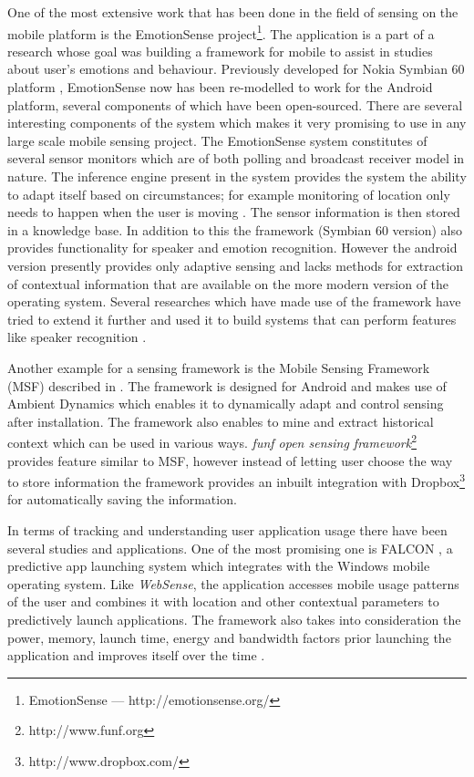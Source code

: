 \documentclass[12pt]{report}
\begin{document}
One of the most extensive work that has been done in the field of sensing on the mobile platform is the EmotionSense project\footnote{EmotionSense — http://emotionsense.org/}. The application is a part of a research whose goal was building a framework for mobile to assist in studies about user's emotions and behaviour. Previously developed for Nokia Symbian 60 platform \cite{rachuri2010emotionsense}, EmotionSense now has been re-modelled to work for the Android platform, several components of which have been open-sourced. There are several interesting components of the system which makes it very promising to use in any large scale mobile sensing project. The EmotionSense system constitutes of several sensor monitors which are of both polling and broadcast receiver model in nature. The inference engine present in the system provides the system the ability to adapt itself based on circumstances; for example monitoring of location only needs to happen when the user is moving \cite{rachuri2010emotionsense}. The sensor information is then stored in a knowledge base. In addition to this the framework (Symbian 60 version) also provides functionality for speaker and emotion recognition. However the android version presently provides only adaptive sensing and lacks methods for extraction of contextual information that are available on the more modern version of the operating system. Several researches which have made use of the framework have tried to extend it further and used it to build systems that can perform features like speaker recognition \cite{lathia2013smartphones}.

Another example for a sensing framework is the Mobile Sensing Framework (MSF) described in \cite{novakextensible2013}. The framework is designed for Android and makes use of Ambient Dynamics \cite{carlson2012dynamix} which enables it to dynamically adapt and control sensing after installation. The framework also enables to mine and extract historical context which can be used in various ways. \textit{funf open sensing framework}\footnote{http://www.funf.org} provides feature similar to MSF, however instead of letting user choose the way to store information the framework provides an inbuilt integration with Dropbox\footnote{http://www.dropbox.com/} for automatically saving the information.

In terms of tracking and understanding user application usage there have been several studies and applications. One of the most promising one is FALCON \cite{yan2012fast}, a predictive app launching system which integrates with the Windows mobile operating system. Like \textit{WebSense}, the application accesses mobile usage patterns of the user and combines it with location and other contextual parameters to predictively launch applications. The framework also takes into consideration the power, memory, launch time, energy and bandwidth factors prior launching the application and improves itself over the time \cite{yan2012fast}.
\end{document}

